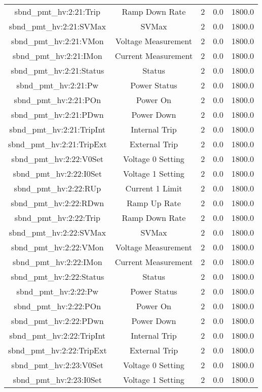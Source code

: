 \begin{center}
\begin{longtable}{c | c c c c }
sbnd\_pmt\_hv:2:21:Trip & Ramp Down Rate & 2 & 0.0 & 1800.0\\ 
sbnd\_pmt\_hv:2:21:SVMax & SVMax & 2 & 0.0 & 1800.0\\ 
sbnd\_pmt\_hv:2:21:VMon & Voltage Measurement & 2 & 0.0 & 1800.0\\ 
sbnd\_pmt\_hv:2:21:IMon & Current Measurement & 2 & 0.0 & 1800.0\\ 
sbnd\_pmt\_hv:2:21:Status & Status & 2 & 0.0 & 1800.0\\ 
sbnd\_pmt\_hv:2:21:Pw & Power Status & 2 & 0.0 & 1800.0\\ 
sbnd\_pmt\_hv:2:21:POn & Power On & 2 & 0.0 & 1800.0\\ 
sbnd\_pmt\_hv:2:21:PDwn & Power Down & 2 & 0.0 & 1800.0\\ 
sbnd\_pmt\_hv:2:21:TripInt & Internal Trip & 2 & 0.0 & 1800.0\\ 
sbnd\_pmt\_hv:2:21:TripExt & External Trip & 2 & 0.0 & 1800.0\\ 
sbnd\_pmt\_hv:2:22:V0Set & Voltage 0 Setting & 2 & 0.0 & 1800.0\\ 
sbnd\_pmt\_hv:2:22:I0Set & Voltage 1 Setting & 2 & 0.0 & 1800.0\\ 
sbnd\_pmt\_hv:2:22:RUp & Current 1 Limit & 2 & 0.0 & 1800.0\\ 
sbnd\_pmt\_hv:2:22:RDwn & Ramp Up Rate & 2 & 0.0 & 1800.0\\ 
sbnd\_pmt\_hv:2:22:Trip & Ramp Down Rate & 2 & 0.0 & 1800.0\\ 
sbnd\_pmt\_hv:2:22:SVMax & SVMax & 2 & 0.0 & 1800.0\\ 
sbnd\_pmt\_hv:2:22:VMon & Voltage Measurement & 2 & 0.0 & 1800.0\\ 
sbnd\_pmt\_hv:2:22:IMon & Current Measurement & 2 & 0.0 & 1800.0\\ 
sbnd\_pmt\_hv:2:22:Status & Status & 2 & 0.0 & 1800.0\\ 
sbnd\_pmt\_hv:2:22:Pw & Power Status & 2 & 0.0 & 1800.0\\ 
sbnd\_pmt\_hv:2:22:POn & Power On & 2 & 0.0 & 1800.0\\ 
sbnd\_pmt\_hv:2:22:PDwn & Power Down & 2 & 0.0 & 1800.0\\ 
sbnd\_pmt\_hv:2:22:TripInt & Internal Trip & 2 & 0.0 & 1800.0\\ 
sbnd\_pmt\_hv:2:22:TripExt & External Trip & 2 & 0.0 & 1800.0\\ 
sbnd\_pmt\_hv:2:23:V0Set & Voltage 0 Setting & 2 & 0.0 & 1800.0\\ 
sbnd\_pmt\_hv:2:23:I0Set & Voltage 1 Setting & 2 & 0.0 & 1800.0\\ 

\end{longtable}
\end{center}

